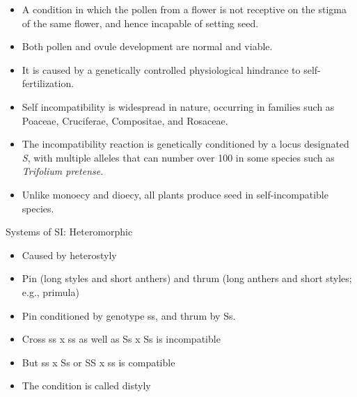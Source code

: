 \documentclass[11pt,ignorenonframetext,aspectratio=169]{beamer}
\providecommand{\tightlist}{%
  \setlength{\itemsep}{0pt}\setlength{\parskip}{0pt}}
\begin{document}
\begin{frame}{}
\protect\hypertarget{section-3}{}
\begin{itemize}
\tightlist
\item
  A condition in which the pollen from a flower is not receptive on the
  stigma of the same flower, and hence incapable of setting seed.
\item
  Both pollen and ovule development are normal and viable.
\item
  It is caused by a genetically controlled physiological hindrance to
  self-fertilization.
\item
  Self incompatibility is widespread in nature, occurring in families
  such as Poaceae, Cruciferae, Compositae, and Rosaceae.
\item
  The incompatibility reaction is genetically conditioned by a locus
  designated \emph{S}, with multiple alleles that can number over 100 in
  some species such as \emph{Trifolium pretense}.
\item
  Unlike monoecy and dioecy, all plants produce seed in
  self-incompatible species.
\end{itemize}
\end{frame}

\begin{frame}{Systems of SI: Heteromorphic}
\protect\hypertarget{systems-of-si-heteromorphic}{}
\begin{itemize}
\tightlist
\item
  Caused by heterostyly
\item
  Pin (long styles and short anthers) and thrum (long anthers and short
  styles; e.g., primula)
\item
  Pin conditioned by genotype ss, and thrum by Ss.
\item
  Cross ss x ss as well as Ss x Ss is incompatible
\item
  But ss x Ss or SS x ss is compatible
\item
  The condition is called distyly
\end{itemize}
\end{frame}
\end{document}
